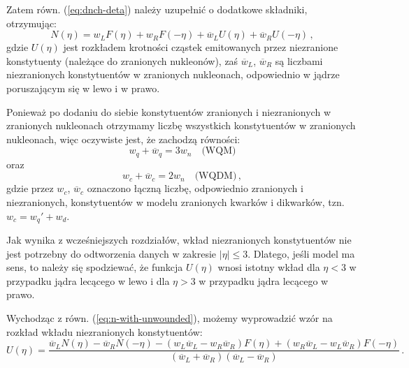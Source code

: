 \documentclass[a4paper,12pt]{article}
\begin{document}
Zatem równ. (\ref{eq:dnch-deta}) należy uzupełnić o dodatkowe składniki, otrzymując:
\begin{equation} \label{eq:n-with-unwounded}
N(\eta) = w_L F(\eta) + w_R F(-\eta) + \overline{w}_L U(\eta) + \overline{w}_R U(-\eta)  \,,
\end{equation}
gdzie $U(\eta)$ jest rozkładem krotności cząstek emitowanych przez niezranione konstytuenty (należące do zranionych nukleonów), zaś $\overline{w}_L$, $\overline{w}_R$ są liczbami niezranionych konstytuentów w zranionych nukleonach, odpowiednio w jądrze poruszającym się w lewo i w prawo.

Ponieważ po dodaniu do siebie konstytuentów zranionych i niezranionych w zranionych nukleonach otrzymamy liczbę wszystkich konstytuentów w zranionych nukleonach, więc oczywiste jest, że zachodzą równości:
\begin{equation}
w_q + \overline{w}_q = 3 w_n \quad \text{(WQM)}
\end{equation}
oraz
\begin{equation}
w_c + \overline{w}_c = 2 w_n \quad \text{(WQDM)}\,,
\end{equation}
gdzie przez $w_c$, $\overline{w}_c$ oznaczono łączną liczbę, odpowiednio zranionych i niezranionych, konstytuentów w modelu zranionych kwarków i dikwarków, tzn. $w_c = w_q' + w_d$. 

Jak wynika z wcześniejszych rozdziałów, wkład niezranionych konstytuentów nie jest potrzebny do odtworzenia danych w zakresie $|\eta| \le 3$. Dlatego, jeśli model ma sens, to należy się spodziewać, że funkcja $U(\eta)$ wnosi istotny wkład dla $\eta < 3$ w przypadku jądra lecącego w lewo i dla $\eta > 3$ w przypadku jądra lecącego w prawo.

Wychodząc z równ. (\ref{eq:n-with-unwounded}), możemy wyprowadzić wzór na rozkład wkładu niezranionych konstytuentów:
\begin{equation} \label{eq:unqound-fun}
U(\eta) = \frac{\overline{w}_L N(\eta) - \overline{w}_R N(-\eta) - (w_L \overline{w}_L - w_R \overline{w}_R)F(\eta) + (w_R \overline{w}_L - w_L \overline{w}_R)F(-\eta)}{(\overline{w}_L + \overline{w}_R)(\overline{w}_L - \overline{w}_R)}\,.
\end{equation}
\end{document}
